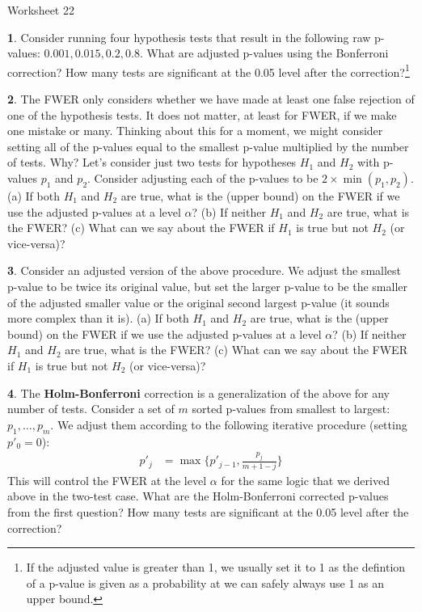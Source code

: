 \documentclass{tufte-handout}
\begin{document}
\justify

{\LARGE Worksheet 22}

\vspace*{18pt}


\textbf{1}. Consider running four hypothesis tests that result in the following raw
p-values: $0.001, 0.015, 0.2, 0.8$. What are adjusted p-values using the
Bonferroni correction? How many tests are significant at the 0.05 level
after the correction?\footnote{
  If the adjusted value is greater than 1, we usually set it
  to 1 as the defintion of a p-value is given as a probability
  at we can safely always use 1 as an upper bound.
}

\textbf{2}. The FWER only considers whether we have made at least one false rejection
of one of the hypothesis tests. It does not matter, at least for FWER, if
we make one mistake or many. Thinking about this for a moment, we might
consider setting all of the p-values equal to the smallest p-value multiplied
by the number of tests. Why? Let's consider just two tests for hypotheses
$H_1$ and $H_2$ with p-values $p_1$ and $p_2$. Consider adjusting each 
of the p-values to be $2 \times \min(p_1, p_2)$. (a) If both $H_1$ and $H_2$
are true, what is the (upper bound) on the FWER if we use the adjusted
p-values at a level $\alpha$? (b) If neither $H_1$ and $H_2$ are true,
what is the FWER? (c) What can we say about the FWER if $H_1$ is true
but not $H_2$ (or vice-versa)?

\textbf{3}. Consider an adjusted version of the above procedure. We adjust the smallest 
p-value to be twice its original value, but set the larger p-value to be
the smaller of the adjusted smaller value or the original second largest
p-value (it sounds more complex than it is). (a) If both $H_1$ and $H_2$
are true, what is the (upper bound) on the FWER if we use the adjusted
p-values at a level $\alpha$? (b) If neither $H_1$ and $H_2$ are true,
what is the FWER? (c) What can we say about the FWER if $H_1$ is true
but not $H_2$ (or vice-versa)?

\textbf{4}. The \textbf{Holm-Bonferroni} correction is a generalization of the above
for any number of tests. Consider a set of $m$ sorted p-values from smallest
to largest: $p_1, \ldots, p_m$. We adjust them according to the following
iterative procedure (setting $p'_0 = 0$):
\begin{align*}
p'_j &= \max\{ p'_{j-1}, \frac{p_j}{m + 1 - j} \}
\end{align*}
This will control the FWER at the level $\alpha$ for the same logic that we
derived above in the two-test case. What are the Holm-Bonferroni corrected
p-values from the first question? How many tests are significant at the 0.05
level after the correction?
\end{document}
